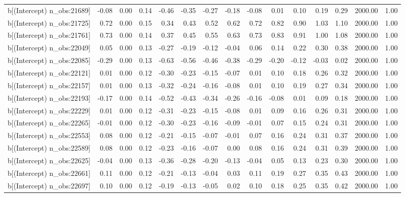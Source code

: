 \begin{table}[ht]
\begin{tabular}{rrrrrrrrrrrrrrr}
  b[(Intercept) n\_obs:21689] & -0.08 & 0.00 & 0.14 & -0.46 & -0.35 & -0.27 & -0.18 & -0.08 & 0.01 & 0.10 & 0.19 & 0.29 & 2000.00 & 1.00 \\ 
  b[(Intercept) n\_obs:21725] & 0.72 & 0.00 & 0.15 & 0.34 & 0.43 & 0.52 & 0.62 & 0.72 & 0.82 & 0.90 & 1.03 & 1.10 & 2000.00 & 1.00 \\ 
  b[(Intercept) n\_obs:21761] & 0.73 & 0.00 & 0.14 & 0.37 & 0.45 & 0.55 & 0.63 & 0.73 & 0.83 & 0.91 & 1.00 & 1.08 & 2000.00 & 1.00 \\ 
  b[(Intercept) n\_obs:22049] & 0.05 & 0.00 & 0.13 & -0.27 & -0.19 & -0.12 & -0.04 & 0.06 & 0.14 & 0.22 & 0.30 & 0.38 & 2000.00 & 1.00 \\ 
  b[(Intercept) n\_obs:22085] & -0.29 & 0.00 & 0.13 & -0.63 & -0.56 & -0.46 & -0.38 & -0.29 & -0.20 & -0.12 & -0.03 & 0.02 & 2000.00 & 1.00 \\ 
  b[(Intercept) n\_obs:22121] & 0.01 & 0.00 & 0.12 & -0.30 & -0.23 & -0.15 & -0.07 & 0.01 & 0.10 & 0.18 & 0.26 & 0.32 & 2000.00 & 1.00 \\ 
  b[(Intercept) n\_obs:22157] & 0.01 & 0.00 & 0.13 & -0.32 & -0.24 & -0.16 & -0.08 & 0.01 & 0.10 & 0.19 & 0.27 & 0.34 & 2000.00 & 1.00 \\ 
  b[(Intercept) n\_obs:22193] & -0.17 & 0.00 & 0.14 & -0.52 & -0.43 & -0.34 & -0.26 & -0.16 & -0.08 & 0.01 & 0.09 & 0.18 & 2000.00 & 1.00 \\ 
  b[(Intercept) n\_obs:22229] & 0.01 & 0.00 & 0.12 & -0.31 & -0.23 & -0.15 & -0.08 & 0.01 & 0.09 & 0.16 & 0.26 & 0.31 & 2000.00 & 1.00 \\ 
  b[(Intercept) n\_obs:22265] & -0.01 & 0.00 & 0.12 & -0.30 & -0.23 & -0.16 & -0.09 & -0.01 & 0.07 & 0.15 & 0.24 & 0.31 & 2000.00 & 1.00 \\ 
  b[(Intercept) n\_obs:22553] & 0.08 & 0.00 & 0.12 & -0.21 & -0.15 & -0.07 & -0.01 & 0.07 & 0.16 & 0.24 & 0.31 & 0.37 & 2000.00 & 1.00 \\ 
  b[(Intercept) n\_obs:22589] & 0.08 & 0.00 & 0.12 & -0.23 & -0.16 & -0.07 & 0.00 & 0.08 & 0.16 & 0.24 & 0.31 & 0.39 & 2000.00 & 1.00 \\ 
  b[(Intercept) n\_obs:22625] & -0.04 & 0.00 & 0.13 & -0.36 & -0.28 & -0.20 & -0.13 & -0.04 & 0.05 & 0.13 & 0.23 & 0.30 & 2000.00 & 1.00 \\ 
  b[(Intercept) n\_obs:22661] & 0.11 & 0.00 & 0.12 & -0.21 & -0.13 & -0.04 & 0.03 & 0.11 & 0.19 & 0.27 & 0.35 & 0.43 & 2000.00 & 1.00 \\ 
  b[(Intercept) n\_obs:22697] & 0.10 & 0.00 & 0.12 & -0.19 & -0.13 & -0.05 & 0.02 & 0.10 & 0.18 & 0.25 & 0.35 & 0.42 & 2000.00 & 1.00 \\ 

\end{tabular}
\end{table}
